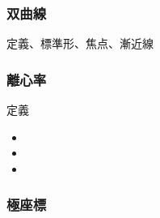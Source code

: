 \documentclass[10pt,dvipdfmx]{jsarticle}
\begin{document}
\subsubsection*{双曲線}
\begin{itembox}[l]{定義、標準形、焦点、漸近線}
  \vspace{20mm}
\end{itembox}
\begin{multicols}{2}
  \begin{minipage}{0.45\textwidth}
    \begin{itembox}[l]{\hspace{3cm}}
      \begin{center}
      \end{center}
    \end{itembox}

  \end{minipage}
  \begin{minipage}{0.45\textwidth}
    \begin{itembox}[l]{\hspace{3cm}}
      \begin{center}
      \end{center}
    \end{itembox}
  \end{minipage}
\end{multicols}


\subsubsection*{離心率}
\begin{itembox}[l]{定義}
  \vspace{8mm}
\end{itembox}
\begin{itemize}
  \item \item \item
\end{itemize}

\subsubsection*{極座標}
\end{document}
